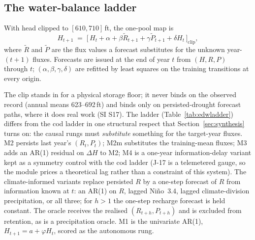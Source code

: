 \subsection{The water-balance ladder}\label{sec:edw_ladder}

\begin{definition}\label{def:pool}
With head clipped to $[610,710]$\,ft, the one-pool map is
\begin{equation}\label{eq:pool}
H_{t+1} \;=\; \bigl[\,H_t + \alpha + \beta\tilde R_{t+1} + \gamma\tilde P_{t+1} + \delta H_t\,\bigr]_{\mathrm{clip}},
\end{equation}
where $\tilde R$ and $\tilde P$ are the flux values a forecast substitutes for the unknown year-$(t+1)$ fluxes. Forecasts are issued at the end of year $t$ from $(H,R,P)$ through $t$; $(\alpha,\beta,\gamma,\delta)$ are refitted by least squares on the training transitions at every origin.
\end{definition}

The clip stands in for a physical storage floor; it never binds on the observed record (annual means 623--692\,ft) and binds only on persisted-drought forecast paths, where it does real work (SI S17). The ladder (Table~\ref{tab:edwladder}) differs from the cod ladder in one structural respect that Section~\ref{sec:synthesis} turns on: the causal rungs must \emph{substitute} something for the target-year fluxes. M2 persists last year's $(R_t,P_t)$; M2m substitutes the training-mean fluxes; M3 adds an AR(1) residual on $\Delta H$ to M2; M4 is a one-year information-delay variant kept as a symmetry control with the cod ladder (J-17 is a telemetered gauge, so the module prices a theoretical lag rather than a constraint of this system). The climate-informed variants replace persisted $R$ by a one-step forecast of $R$ from information known at $t$: an AR(1) on $R$, lagged Ni\~no~3.4, lagged climate-division precipitation, or all three; for $h>1$ the one-step recharge forecast is held constant. The oracle receives the realised $(R_{t+h},P_{t+h})$ and is excluded from retention, as is a precipitation oracle. M1 is the univariate AR(1), $H_{t+1}=a+\varphi H_t$, scored as the autonomous rung.

